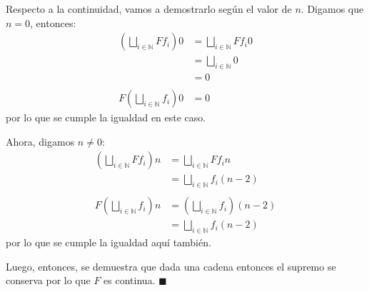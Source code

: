 \documentclass{article}
\newcommand{\N}{\mathbb{N}}
\newcommand{\supr}{\bigsqcup\limits}
\begin{document}
Respecto a la continuidad, vamos a demostrarlo según el valor de $n$.
Digamos que $n = 0$, entonces:
\begin{equation*}
	\begin{aligned}
		\left(\supr_{i \in \N} F f_i\right) 0 & = \supr_{i \in \N} F f_i 0 \\
		                                      & = \supr_{i \in \N} 0       \\
		                                      & = 0                        \\
		\\
		F\left(\supr_{i \in \N} f_i\right) 0  & = 0
	\end{aligned}
\end{equation*}
por lo que se cumple la igualdad en este caso.

Ahora, digamos $n \neq 0$:
\begin{equation*}
	\begin{aligned}
		\left(\supr_{i \in \N} F f_i\right) n & = \supr_{i \in \N} F f_i n                  \\
		                                      & = \supr_{i \in \N} f_i(n - 2)               \\
		\\
		F\left(\supr_{i \in \N} f_i\right) n  & = \left(\supr_{i \in \N} f_i\right) (n - 2) \\
		                                      & = \supr_{i \in \N} f_i(n - 2)
	\end{aligned}
\end{equation*}
por lo que se cumple la igualdad aquí también.

Luego, entonces, se demuestra que dada una cadena entonces el supremo se conserva por lo que $F$ es continua. $\blacksquare$
\end{document}
